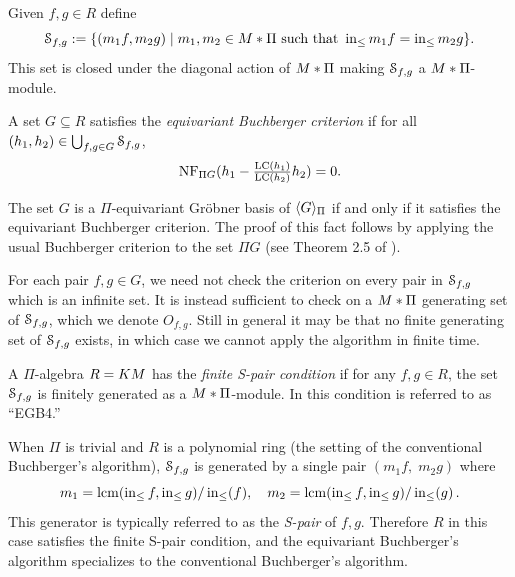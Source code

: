 Given $f,g \in R$ define
 \[ \mathcal S_{f,g} := \{(m_1f,m_2g) \mid m_1,m_2 \in M * \Pi \text{ such that } \operatorname{in}_{\leq} m_1f = \operatorname{in}_{\leq} m_2g\}. \]
This set is closed under the diagonal action of $M *\Pi$ making $\mathcal S_{f,g}$ a $M *\Pi$-module.  

\begin{definition}\label{def:buchberger-criterion}
A set $G \subseteq R$ satisfies the {\em equivariant Buchberger criterion} if for all $(h_1,h_2) \in \bigcup_{f,g\in G} \mathcal S_{f,g}$,
 \[ \operatorname{NF}_{\Pi G}(h_1 - \tfrac{\operatorname{LC}(h_1)}{\operatorname{LC}(h_2)}h_2) = 0. \]
\end{definition}

The set $G$ is a $\Pi$-equivariant Gr\"obner basis of $\langle G \rangle_{\Pi}$ if and only if it satisfies the equivariant Buchberger criterion.  The proof of this fact follows by applying the usual Buchberger criterion to the set $\Pi G$ (see Theorem 2.5 of \cite{Brouwer09e}).

For each pair $f,g \in G$, we need not check the criterion on every pair in $\mathcal S_{f,g}$ which is an infinite set.  It is instead sufficient to check on a $M * \Pi$ generating set of $\mathcal S_{f,g}$, which we denote $O_{f,g}$.  Still in general it may be that no finite generating set of $\mathcal S_{f,g}$ exists, in which case we cannot apply the algorithm in finite time.

\begin{definition}\label{def:finite-s-pair}
 A $\Pi$-algebra $R = KM$ has the {\em finite S-pair condition} if for any $f,g \in R$, the set $\mathcal S_{f,g}$ is finitely generated as a $M * \Pi$-module.  In \cite{Brouwer09e} this condition is referred to as ``EGB4.''
\end{definition}

When $\Pi$ is trivial and $R$ is a polynomial ring (the setting of the conventional Buchberger's algorithm), $\mathcal S_{f,g}$ is generated by a single pair $(m_1 f,\; m_2 g)$ where 
$$
m_1 = \operatorname{lcm}(\operatorname{in}_{\leq} f, \operatorname{in}_{\leq} g)/\operatorname{in}_{\leq}(f),\quad
m_2 = \operatorname{lcm}(\operatorname{in}_{\leq} f, \operatorname{in}_{\leq} g)/\operatorname{in}_{\leq}(g)
\,.
$$  
This generator is typically referred to as the {\em S-pair} of $f,g$.  Therefore $R$ in this case satisfies the finite S-pair condition, and the equivariant Buchberger's algorithm specializes to the conventional Buchberger's algorithm.

